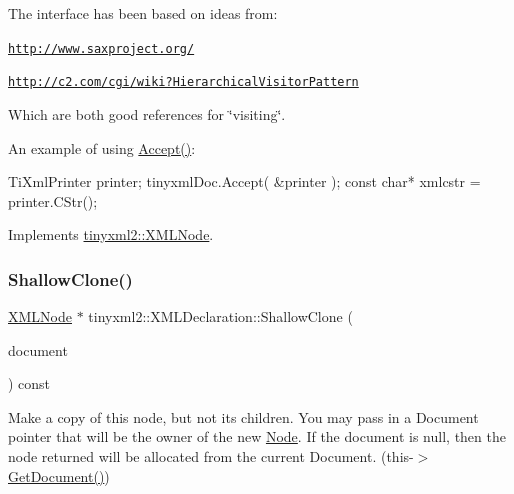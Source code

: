 The interface has been based on ideas from\+:


\begin{DoxyItemize}
\item \href{http://www.saxproject.org/}{\tt http\+://www.\+saxproject.\+org/}
\item \href{http://c2.com/cgi/wiki?HierarchicalVisitorPattern}{\tt http\+://c2.\+com/cgi/wiki?\+Hierarchical\+Visitor\+Pattern}
\end{DoxyItemize}

Which are both good references for \char`\"{}visiting\char`\"{}.

An example of using \hyperlink{classtinyxml2_1_1XMLDeclaration_acf47629d9fc08ed6f1c164a97bcf794b}{Accept()}\+: \begin{DoxyVerb}TiXmlPrinter printer;
tinyxmlDoc.Accept( &printer );
const char* xmlcstr = printer.CStr();
\end{DoxyVerb}
 

Implements \hyperlink{classtinyxml2_1_1XMLNode_a81e66df0a44c67a7af17f3b77a152785}{tinyxml2\+::\+X\+M\+L\+Node}.

\mbox{\label{classtinyxml2_1_1XMLDeclaration_ad9d60e6d2df75c13eb6bf7319985b747}} 
\subsubsection{\texorpdfstring{Shallow\+Clone()}{ShallowClone()}\hspace{0.1cm}{\footnotesize\ttfamily [1/2]}}
{\footnotesize\ttfamily \hyperlink{classtinyxml2_1_1XMLNode}{X\+M\+L\+Node} $\ast$ tinyxml2\+::\+X\+M\+L\+Declaration\+::\+Shallow\+Clone (\begin{DoxyParamCaption}\item[{\hyperlink{classtinyxml2_1_1XMLDocument}{X\+M\+L\+Document} $\ast$}]{document }\end{DoxyParamCaption}) const\hspace{0.3cm}{\ttfamily [virtual]}}

Make a copy of this node, but not its children. You may pass in a Document pointer that will be the owner of the new \hyperlink{classNode}{Node}. If the \textquotesingle{}document\textquotesingle{} is null, then the node returned will be allocated from the current Document. (this-\/$>$\hyperlink{classtinyxml2_1_1XMLNode_af343d1ef0b45c0020e62d784d7e67a68}{Get\+Document()})

